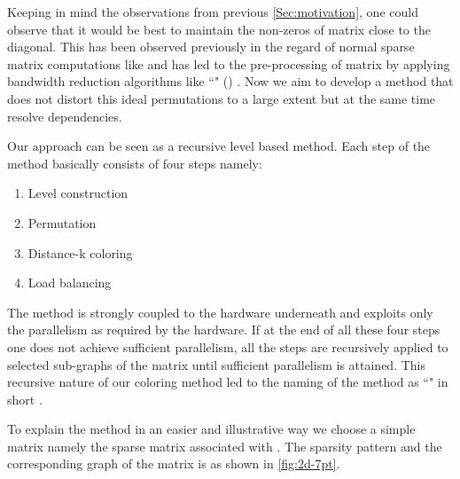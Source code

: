 Keeping in mind the observations from previous \cref{Sec:motivation}, one could observe that it would be best to maintain the non-zeros of matrix close to the diagonal. This has been observed previously in the regard of normal sparse matrix computations like \SpMV and has led to the pre-processing of matrix by applying bandwidth reduction algorithms like ``\RCMfull" (\RCM) \cite{RCM,RCM_Sparse_computation}. Now we aim to develop a method that does not distort this ideal permutations to a large extent but at the same time resolve \DK dependencies. 
 
Our approach can be seen as a recursive level based method. Each step of the method basically consists of four steps namely:
\begin{enumerate}
	\item Level construction
	\item Permutation
	\item Distance-k coloring
	\item Load balancing
\end{enumerate}
The method is strongly coupled to the hardware underneath and exploits only the parallelism as required by the hardware. If at the end of all these four steps one does not achieve sufficient parallelism, all the steps are recursively applied to selected sub-graphs of the matrix until sufficient parallelism is attained. This recursive nature of our coloring method led to the naming of the method as ``\RACfullNoSpace" in short \RAC.

To explain the method in an easier and illustrative way we choose a simple matrix namely the sparse matrix associated with \STEX. The sparsity pattern and the corresponding graph of the matrix is as shown in \cref{fig:2d-7pt}.

